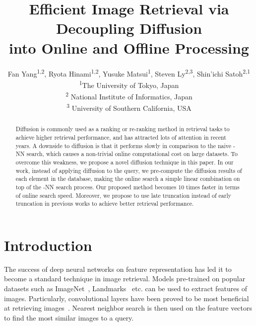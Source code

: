 \documentclass[letterpaper]{article} \usepackage{aaai19}  \usepackage{times}  \usepackage{helvet}  \usepackage{courier}  \usepackage{url}  \usepackage{graphicx}  \frenchspacing  \setlength{\pdfpagewidth}{8.5in}  \setlength{\pdfpageheight}{11in}
\begin{document}
\title{Efficient Image Retrieval via Decoupling Diffusion \\ into Online and Offline Processing}
\author{Fan Yang\textsuperscript{1,2}, Ryota Hinami\textsuperscript{1,2}, Yusuke Matsui\textsuperscript{1}, Steven Ly\textsuperscript{2,3}, Shin'ichi Satoh\textsuperscript{2,1} \\
\textsuperscript{1}The University of Tokyo, Japan \\
\textsuperscript{2} National Institute of Informatics, Japan \\
\textsuperscript{3} University of Southern California, USA
}

\maketitle
\begin{abstract}
Diffusion is commonly used as a ranking or re-ranking method in retrieval tasks to achieve higher retrieval performance, and has attracted lots of attention in recent years.
A downside to diffusion is that it performs slowly in comparison to the naive -NN search, which causes a non-trivial online computational cost on large datasets.
To overcome this weakness, we propose a novel diffusion technique in this paper.
In our work, instead of applying diffusion to the query, we pre-compute the diffusion results of each element in the database, making the online search a simple linear combination on top of the -NN search process.
Our proposed method becomes 10 times faster in terms of online search speed.
Moreover, we propose to use late truncation instead of early truncation in previous works to achieve better retrieval performance.
\end{abstract}


\section{Introduction}

The success of deep neural networks on feature representation has led it to become a standard technique in image retrieval.
Models pre-trained on popular datasets such as ImageNet~\cite{deng2009imagenet}, Landmarks~\cite{babenko2014neural} etc. can be used to extract features of images.
Particularly, convolutional layers have been proved to be most beneficial at retrieving images~\cite{babenko2014neural,radenovic2016cnn,gordo2016deep,razavian2016visual}.
Nearest neighbor search is then used on the feature vectors to find the most similar images to a query.
\end{document}
